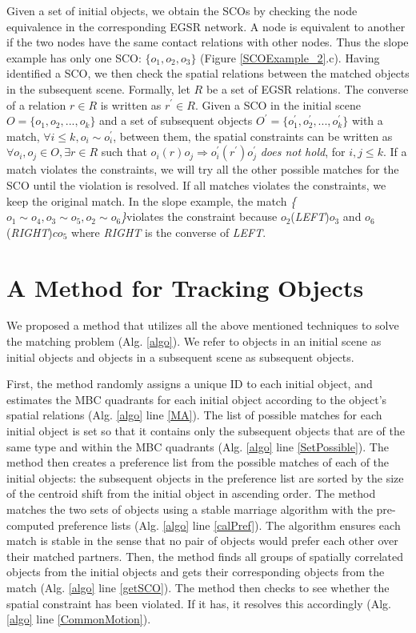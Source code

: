 \documentclass[letterpaper]{article}
\begin{document}
Given a set of initial objects, we obtain the SCOs by checking the node equivalence in the corresponding EGSR network. A node is equivalent to another if the two nodes have the same contact relations with other nodes. Thus the slope example has only one SCO: $\{o_1, o_2, o_3\}$ (Figure \ref{SCOExample_2}.c). Having identified a SCO, we then check the spatial relations between the matched objects in the subsequent scene. Formally, let $R$ be a set of EGSR relations. The converse of a relation $r \in R$ is written as $r^{\prime} \in R$. Given a SCO in the initial scene $O = \{o_1, o_2, ... , o_k\}$ and a set of subsequent objects $O^\prime = \{o^{\prime}_1, o^{\prime}_2, ..., o^{\prime}_k \}$ with a match, $\forall i\leq k, o_i \sim o^{\prime}_i$, between them, the spatial constraints can be written as $\forall o_i,o_j\in O, \exists r\in R$ such that $o_i (r) o_j \Rightarrow o^{\prime}_i (r^{\prime}) o^{\prime}_j$ \emph{does not hold}, for $i,j \leq k$. If a match violates the constraints, we will try all the other possible matches for the SCO until the violation is resolved. If all matches violates the constraints, we keep the original match. In the slope example, the match \emph{\{$o_1\sim o_4, o_3\sim o_5, o_2 \sim o_6$\}}violates the constraint because $o_2$(\emph{LEFT})$o_3$ and $o_6$(\emph{RIGHT})$co_5$ where \emph{RIGHT} is the converse of \emph{LEFT}.




\section{A Method for Tracking Objects}

We proposed a method that utilizes all the above mentioned techniques to solve the matching problem (Alg. \ref{algo}). We refer to objects in an initial scene as initial objects and objects in a subsequent scene as subsequent objects.

First, the method randomly assigns a unique ID to each initial object, and estimates the MBC quadrants for each initial object according to the object's spatial relations (Alg. \ref{algo} line \ref{MA}). The list of possible matches for each initial object is set so that it contains only the subsequent objects that are of the same type and within the MBC quadrants (Alg. \ref{algo} line \ref{SetPossible}). The method then creates a preference list from the possible matches of each of the initial objects: the subsequent objects in the preference list are sorted by the size of the centroid shift from the initial object in ascending order. The method matches the two sets of objects using a stable marriage algorithm \cite{gale1962college} with the pre-computed preference lists (Alg. \ref{algo} line \ref{calPref}). The algorithm ensures each match is stable in the sense that no pair of objects would prefer each other over their matched partners. Then, the method finds all groups of spatially correlated objects from the initial objects and gets their corresponding objects from the match (Alg. \ref{algo} line \ref{getSCO}). The method then checks to see whether the spatial constraint  has been violated. If it has, it resolves this accordingly (Alg. \ref{algo} line \ref{CommonMotion}).
\vspace{-0.5mm}
\end{document}
